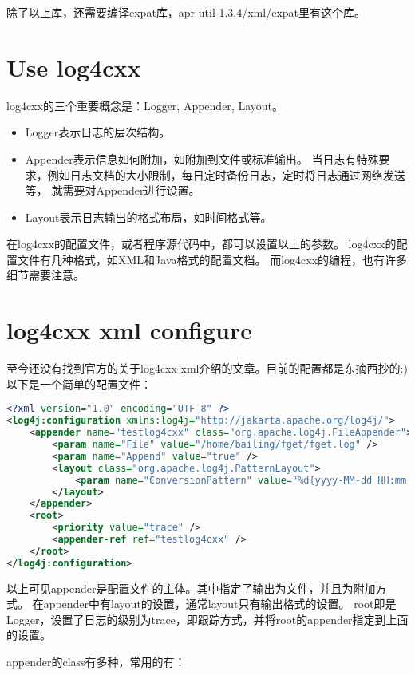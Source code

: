 除了以上库，还需要编译expat库，apr-util-1.3.4/xml/expat里有这个库。

\section{Use log4cxx}
log4cxx的三个重要概念是：Logger, Appender, Layout。
\begin{itemize}
\item Logger表示日志的层次结构。
\item Appender表示信息如何附加，如附加到文件或标准输出。
当日志有特殊要求，例如日志文档的大小限制，每日定时备份日志，定时将日志通过网络发送等，
就需要对Appender进行设置。
\item Layout表示日志输出的格式布局，如时间格式等。
\end{itemize}

在log4cxx的配置文件，或者程序源代码中，都可以设置以上的参数。
log4cxx的配置文件有几种格式，如XML和Java格式的配置文档。
而log4cxx的编程，也有许多细节需要注意。

\section{log4cxx xml configure}
至今还没有找到官方的关于log4cxx xml介绍的文章。目前的配置都是东摘西抄的:)
以下是一个简单的配置文件：

\noindent\begin{lstlisting}[language=XML, basewidth={0.45em, 0.25em}, fontadjust]
<?xml version="1.0" encoding="UTF-8" ?>
<log4j:configuration xmlns:log4j="http://jakarta.apache.org/log4j/">
    <appender name="testlog4cxx" class="org.apache.log4j.FileAppender">
        <param name="File" value="/home/bailing/fget/fget.log" />
        <param name="Append" value="true" />
        <layout class="org.apache.log4j.PatternLayout">
            <param name="ConversionPattern" value="%d{yyyy-MM-dd HH:mm:ss} (%F:%L) - %m%n"/>
        </layout>
    </appender>
    <root>
        <priority value="trace" />
        <appender-ref ref="testlog4cxx" />
    </root>
</log4j:configuration>
\end{lstlisting}

以上可见appender是配置文件的主体。其中指定了输出为文件，并且为附加方式。
在appender中有layout的设置，通常layout只有输出格式的设置。
root即是Logger，设置了日志的级别为trace，即跟踪方式，并将root的appender指定到上面的设置。

appender的class有多种，常用的有：

